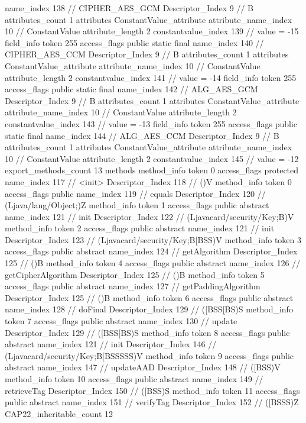 {{{{{				name_index	138		// CIPHER_AES_GCM
				Descriptor_Index	9		// B
				attributes_count	1
				attributes {
				ConstantValue_attribute {
					attribute_name_index	10		// ConstantValue
					attribute_length	2
					constantvalue_index	139		// value = -15
				}
				}
			}
			field_info {
				token	255
				access_flags	public static final
				name_index	140		// CIPHER_AES_CCM
				Descriptor_Index	9		// B
				attributes_count	1
				attributes {
				ConstantValue_attribute {
					attribute_name_index	10		// ConstantValue
					attribute_length	2
					constantvalue_index	141		// value = -14
				}
				}
			}
			field_info {
				token	255
				access_flags	public static final
				name_index	142		// ALG_AES_GCM
				Descriptor_Index	9		// B
				attributes_count	1
				attributes {
				ConstantValue_attribute {
					attribute_name_index	10		// ConstantValue
					attribute_length	2
					constantvalue_index	143		// value = -13
				}
				}
			}
			field_info {
				token	255
				access_flags	public static final
				name_index	144		// ALG_AES_CCM
				Descriptor_Index	9		// B
				attributes_count	1
				attributes {
				ConstantValue_attribute {
					attribute_name_index	10		// ConstantValue
					attribute_length	2
					constantvalue_index	145		// value = -12
				}
				}
			}
			}
			export_methods_count	13
			methods {
				method_info {
					token	0
					access_flags	protected
					name_index	117		// <init>
					Descriptor_Index	118		// ()V
				}
				method_info {
					token	0
					access_flags	public
					name_index	119		// equals
					Descriptor_Index	120		// (Ljava/lang/Object;)Z
				}
				method_info {
					token	1
					access_flags	public abstract
					name_index	121		// init
					Descriptor_Index	122		// (Ljavacard/security/Key;B)V
				}
				method_info {
					token	2
					access_flags	public abstract
					name_index	121		// init
					Descriptor_Index	123		// (Ljavacard/security/Key;B[BSS)V
				}
				method_info {
					token	3
					access_flags	public abstract
					name_index	124		// getAlgorithm
					Descriptor_Index	125		// ()B
				}
				method_info {
					token	4
					access_flags	public abstract
					name_index	126		// getCipherAlgorithm
					Descriptor_Index	125		// ()B
				}
				method_info {
					token	5
					access_flags	public abstract
					name_index	127		// getPaddingAlgorithm
					Descriptor_Index	125		// ()B
				}
				method_info {
					token	6
					access_flags	public abstract
					name_index	128		// doFinal
					Descriptor_Index	129		// ([BSS[BS)S
				}
				method_info {
					token	7
					access_flags	public abstract
					name_index	130		// update
					Descriptor_Index	129		// ([BSS[BS)S
				}
				method_info {
					token	8
					access_flags	public abstract
					name_index	121		// init
					Descriptor_Index	146		// (Ljavacard/security/Key;B[BSSSSS)V
				}
				method_info {
					token	9
					access_flags	public abstract
					name_index	147		// updateAAD
					Descriptor_Index	148		// ([BSS)V
				}
				method_info {
					token	10
					access_flags	public abstract
					name_index	149		// retrieveTag
					Descriptor_Index	150		// ([BSS)S
				}
				method_info {
					token	11
					access_flags	public abstract
					name_index	151		// verifyTag
					Descriptor_Index	152		// ([BSSS)Z
				}
			}
			CAP22_inheritable_count	12
		}
	}
}
